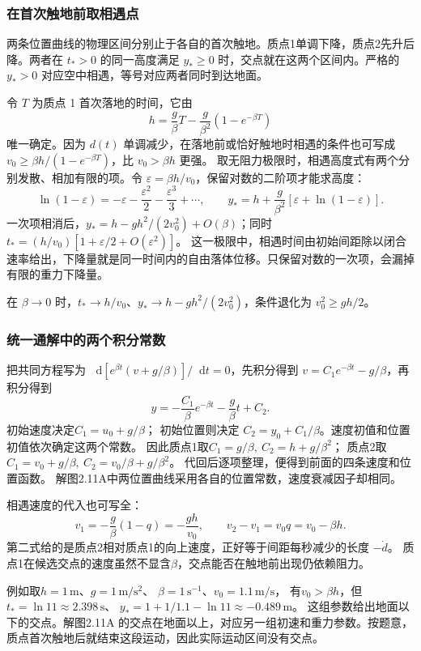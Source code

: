 \documentclass[UTF8,fontset=fandol,a4paper,11pt]{ctexart}
\newcommand{\dd}{\mathop{}\!\mathrm{d}}
\begin{document}
\subsubsection*{在首次触地前取相遇点}
两条位置曲线的物理区间分别止于各自的首次触地。质点1单调下降，质点2先升后降。两者在 $t_*>0$ 的同一高度满足 $\boxed{y_*\geq0}$ 时，交点就在这两个区间内。严格的 $y_*>0$ 对应空中相遇，等号对应两者同时到达地面。

令 $T$ 为质点 1 首次落地的时间，它由
\[
h=\frac g\beta T-\frac g{\beta^2}(1-e^{-\beta T})
\]
唯一确定。因为 $d(t)$ 单调减少，在落地前或恰好触地时相遇的条件也可写成 $v_0\geq\beta h/(1-e^{-\beta T})$，比 $v_0>\beta h$ 更强。
取无阻力极限时，相遇高度式有两个分别发散、相加有限的项。令
$\varepsilon=\beta h/v_0$，保留对数的二阶项才能求高度：
\[
\ln(1-\varepsilon)=-\varepsilon-\frac{\varepsilon^2}{2}
-\frac{\varepsilon^3}{3}+\cdots,
\qquad
y_*=h+\frac g{\beta^2}
[\varepsilon+\ln(1-\varepsilon)].
\]
一次项相消后，$y_*=h-gh^2/(2v_0^2)+O(\beta)$；同时
$t_*=(h/v_0)[1+\varepsilon/2+O(\varepsilon^2)]$。
这一极限中，相遇时间由初始间距除以闭合速率给出，下降量就是同一时间内的自由落体位移。只保留对数的一次项，会漏掉有限的重力下降量。

在 $\beta\to0$ 时，$t_*\to h/v_0$、$y_*\to h-gh^2/(2v_0^2)$，条件退化为 $v_0^2\geq gh/2$。
\subsubsection*{统一通解中的两个积分常数}
把共同方程写为
$\dd[e^{\beta t}(v+g/\beta)]/\dd t=0$，先积分得到
$v=C_1e^{-\beta t}-g/\beta$，再积分得到
\[
y=-\frac{C_1}{\beta}e^{-\beta t}-\frac g\beta t+C_2.
\]
初始速度决定$C_1=u_0+g/\beta$；
初始位置则决定 $C_2=y_0+C_1/\beta$。速度初值和位置初值依次确定这两个常数。
因此质点1取$C_1=g/\beta,\ C_2=h+g/\beta^2$；
质点2取$C_1=v_0+g/\beta,\ C_2=v_0/\beta+g/\beta^2$。
代回后逐项整理，便得到前面的四条速度和位置函数。
解图2.11A中两位置曲线采用各自的位置常数，速度衰减因子却相同。

相遇速度的代入也可写全：
\[
v_1=-\frac g\beta(1-q)=-\frac{gh}{v_0},\qquad
v_2-v_1=v_0q=v_0-\beta h.
\]
第二式给的是质点2相对质点1的向上速度，正好等于间距每秒减少的长度 $-\dot d$。
质点1在候选交点的速度虽然不显含$\beta$，交点能否在触地前出现仍依赖阻力。

例如取$h=1\,\mathrm m$、$g=1\,\mathrm{m/s^2}$、
$\beta=1\,\mathrm{s^{-1}}$、$v_0=1.1\,\mathrm{m/s}$，
有$v_0>\beta h$，但
$t_*=\ln11\approx2.398\,\mathrm s$、
$y_*=1+1/1.1-\ln11\approx-0.489\,\mathrm m$。
这组参数给出地面以下的交点。解图2.11A 的交点在地面以上，对应另一组初速和重力参数。按题意，质点首次触地后就结束这段运动，因此实际运动区间没有交点。
\end{document}
